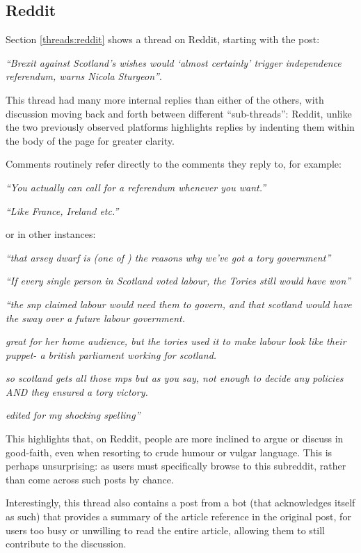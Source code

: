 \subsection{Reddit}
Section \ref{threads:reddit} shows a thread on Reddit, starting with the post:
	
\textit{``Brexit against Scotland's wishes would `almost certainly' trigger independence referendum, warns Nicola Sturgeon''}.

This thread had many more internal replies than either of the others, with discussion moving back and forth between different ``sub-threads'': Reddit, unlike the two previously observed platforms highlights replies by indenting them within the body of the page for greater clarity.

Comments routinely refer directly to the comments they reply to, for example:

\textit{``You actually can call for a referendum whenever you want.''}


\textit{``Like France, Ireland etc.''}

or in other instances:

\textit{``that arsey dwarf is (one of ) the reasons why we've got a tory government''}


\textit{``If every single person in Scotland voted labour, the Tories still would have won''}


\textit{``the snp claimed labour would need them to govern, and that scotland would have the sway over a future labour government.}

\textit{great for her home audience, but the tories used it to make labour look like their puppet- a british parliament working for scotland. }

\textit{so scotland gets all those mps but as you say, not enough to decide any policies AND they ensured a tory victory.}

\textit{edited for my shocking spelling''}

This highlights that, on Reddit, people are more inclined to argue or discuss in good-faith, even when resorting to crude humour or vulgar language. This is perhaps unsurprising: as users must specifically browse to this subreddit, rather than come across such posts by chance.

Interestingly, this thread also contains a post from a bot (that acknowledges itself as such) that provides a summary of the article reference in the original post, for users too busy or unwilling to read the entire article, allowing them to still  contribute to the discussion.

